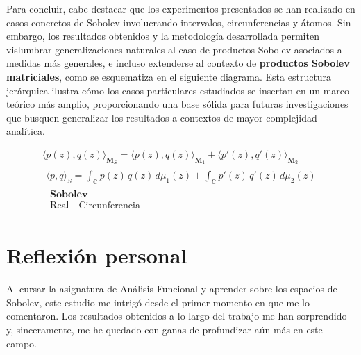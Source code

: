 Para concluir, cabe destacar que los experimentos presentados se han realizado en casos concretos de Sobolev involucrando intervalos, circunferencias y átomos. Sin embargo, los resultados obtenidos y la metodología desarrollada permiten vislumbrar generalizaciones naturales al caso de productos Sobolev asociados a medidas más generales, e incluso extenderse al contexto de \textbf{productos Sobolev matriciales}, como se esquematiza en el siguiente diagrama. Esta estructura jerárquica ilustra cómo los casos particulares estudiados se insertan en un marco teórico más amplio, proporcionando una base sólida para futuras investigaciones que busquen generalizar los resultados a contextos de mayor complejidad analítica.

\[
	\boxed{\!\!
		\begin{array}{c}
			\displaystyle
			\langle p(z),q(z)\rangle_{\textbf{M}_S}
			=\langle p(z),q(z)\rangle_{\textbf{M}_1}
			+\langle p'(z),q'(z)\rangle_{\textbf{M}_2}  %
			\\[6pt]                            %
			\boxed{\!\!
				\begin{array}{c}
					\displaystyle
					\langle p,q\rangle_{S}
					=\int_{\mathbb{C}} p(z)\,q(z)\,d\mu_1(z)
					+\int_{\mathbb{C}} p'(z)\,q'(z)\,d\mu_2(z)   %
					\\[6pt]
					\boxed{\!\!
						\begin{array}{c}
							\textbf{Sobolev} \\[4pt]
							\boxed{\text{Real}}\quad
							\boxed{\text{Circunferencia}}
						\end{array}
					}%
				\end{array}
			}%
		\end{array}
	}\!
\]

\section{Reflexión personal}

Al cursar la asignatura de Análisis Funcional y aprender sobre los espacios de Sobolev, este estudio me intrigó desde el primer momento en que me lo comentaron. Los resultados obtenidos a lo largo del trabajo me han sorprendido y, sinceramente, me he quedado con ganas de profundizar aún más en este campo.

